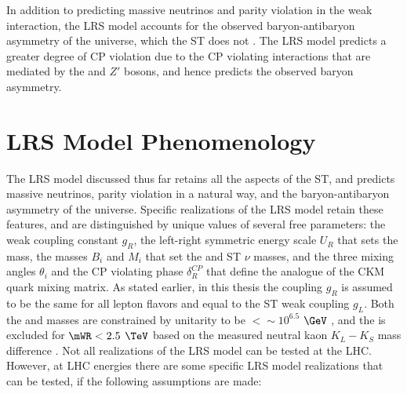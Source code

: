In addition to predicting massive neutrinos and parity violation in the weak interaction, the LRS model accounts 
for the observed baryon-antibaryon asymmetry of the universe, which the ST does not \cite{surveyOfExtensions}.  
The LRS model predicts a greater degree of CP violation due to the CP violating interactions that are mediated by 
the \WR and $Z'$ bosons, and hence predicts the observed baryon asymmetry.


\section{LRS Model Phenomenology}
\label{sec:lrsPhenomenology}
The LRS model discussed thus far retains all the aspects of the ST, and predicts 
massive neutrinos, parity violation in a natural way, and the baryon-antibaryon asymmetry of the universe.  
Specific realizations of the LRS model retain these features, and are distinguished by unique values of 
several free parameters: the weak coupling constant $g_{R}$, the left-right symmetric energy scale $U_{R}$ 
that sets the \WR mass, the masses $B_{i}$ and $M_{i}$ that set the \nul and ST $\nu$ masses, and the three 
mixing angles $\theta_{i}$ and the CP violating phase $\delta_{R}^{CP}$ that define the \WR analogue 
of the CKM quark mixing matrix.  As stated earlier, in this thesis the coupling $g_{R}$ is assumed to be 
the same for all lepton flavors and equal to the ST weak coupling $g_{L}$.  Both the \WR and \nul masses 
are constrained by unitarity to be $< \sim10^{6.5}$ $\GeV$ \cite{lrsMassConstraints}, and the \WR is 
excluded for $\mWR < 2.5$ $\TeV$ based on the measured neutral kaon $K_{L} - K_{S}$ mass difference \cite{mwrBoundFromNeutralKaons}.  
Not all realizations of the LRS model can be tested at the LHC.  However, at LHC energies there are some 
specific LRS model realizations that can be tested, if the following assumptions are made:

